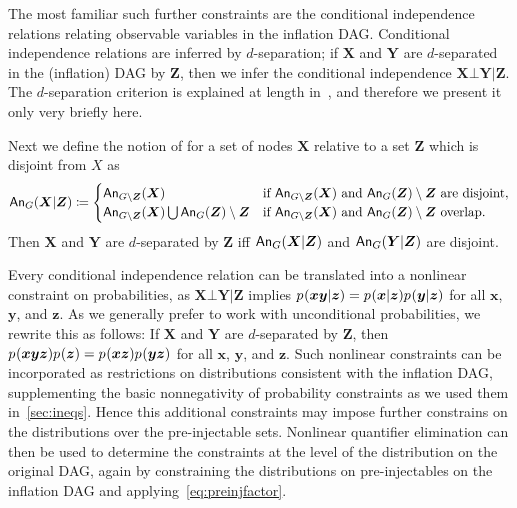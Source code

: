 \begin{asparadesc}
\medskip\item[\tred{Conditional Independence Relations}] \noindent
\par\hspace{\parskip} 
The most familiar such further constraints are the conditional independence relations relating observable variables in the inflation DAG. Conditional independence relations are inferred by $d$-separation; if $\bm{X}$ and $\bm{Y}$ are $d$-separated in the (inflation) DAG by $\bm{Z}$, then we infer the conditional independence $\bm{X}\bot\bm{Y}|\bm{Z}$. The $d$-separation criterion is explained at length in~\cite{pearl2009causality,studeny2005probabilistic,WoodSpekkens,pusey2014gdag}, and therefore we present it only very briefly here.

Next we define 
the notion of  for a set of nodes $\bm{X}$ relative to a set $\bm{Z}$ which is disjoint from $X$ as
\begin{align}
    \An[G]{\bm{X}|\bm{Z}}\coloneqq \begin{cases}
	    \An[G\setminus\bm{Z}]{\bm{X}}& \text{if } \An[G\setminus\bm{Z}]{\bm{X}}\text{ and }\An[G]{\bm{Z}}\setminus\bm{Z}\text{ are disjoint},\\
	    \An[G\setminus\bm{Z}]{\bm{X}} \bigcup \An[G]{\bm{Z}}\setminus\bm{Z} & \text{if } \An[G\setminus\bm{Z}]{\bm{X}}\text{ and } \An[G]{\bm{Z}}\setminus\bm{Z}\text{ overlap.}
    \end{cases}
\end{align}
Then $\bm{X}$ and $\bm{Y}$ are $d$-separated by $\bm{Z}$ iff $\An[G]{\bm{X}|\bm{Z}}$ and $\An[G]{\bm{Y}|\bm{Z}}$ are disjoint.

Every conditional independence relation can be translated into a nonlinear constraint on probabilities, as $\bm{X}\bot\bm{Y}|\bm{Z}$ implies $\p{\bm{x}\bm{y}|\bm{z}}=\p{\bm{x}|\bm{z}}\p{\bm{y}|\bm{z}}$ for all $\bm{x}$, $\bm{y}$, and $\bm{z}$. As we generally prefer to work with unconditional probabilities, we rewrite this as follows: If $\bm{X}$ and $\bm{Y}$ are $d$-separated by $\bm{Z}$, then $\p{\bm{x}\bm{y}\bm{z}}\p{\bm{z}}=\p{\bm{x}\bm{z}}\p{\bm{y}\bm{z}}$ for all $\bm{x}$, $\bm{y}$, and $\bm{z}$. Such nonlinear constraints can be incorporated as restrictions on distributions consistent with the inflation DAG, supplementing the basic nonnegativity of probability constraints as we used them in~\cref{sec:ineqs}. Hence this additional constraints may impose further constrains on the distributions over the pre-injectable sets. Nonlinear quantifier elimination can then be used to determine the constraints at the level of the distribution on the original DAG, again by constraining the distributions on pre-injectables on the inflation DAG and applying~\cref{eq:preinjfactor}.


\end{asparadesc}
